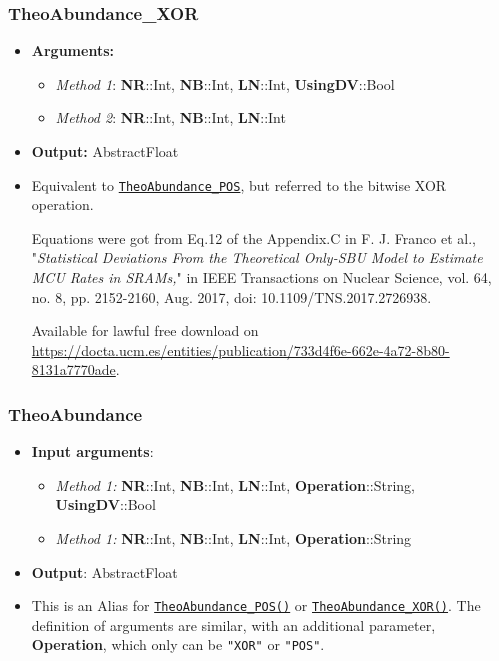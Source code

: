 \subsubsection*{TheoAbundance\_XOR}\label{Subsec:TheoAbundance_XOR}
%
\begin{itemize}
	\item \textbf{Arguments:}
	\begin{itemize}
		\item \textit{Method 1}: \textbf{NR}::Int, \textbf{NB}::Int, \textbf{LN}::Int, \textbf{UsingDV}::Bool
		\item \textit{Method 2}: \textbf{NR}::Int, \textbf{NB}::Int, \textbf{LN}::Int
	\end{itemize}
	\item \textbf{Output:} AbstractFloat
	\item Equivalent to \hyperref[Subsec:TheoAbundance_POS]{\texttt{TheoAbundance\_POS}}, but referred to the bitwise XOR operation. 
	
	Equations were got from Eq.12 of the Appendix.C in 
	F. J. Franco et al., "\textit{Statistical Deviations From the Theoretical Only-SBU
		Model to Estimate MCU Rates in SRAMs,}" in IEEE Transactions on Nuclear
	Science, vol. 64, no. 8, pp. 2152-2160, Aug. 2017,
	doi: 10.1109/TNS.2017.2726938. 
	
	Available for lawful free download on  \href{https://docta.ucm.es/entities/publication/733d4f6e-662e-4a72-8b80-8131a7770ade}{https://docta.ucm.es/entities/publication/733d4f6e-662e-4a72-8b80-8131a7770ade}.
\end{itemize}
%
\subsubsection*{TheoAbundance}\label{Subsec:TheoAbundance}
%
\begin{itemize}
	\item \textbf{Input arguments}:
	\begin{itemize}
		\item \textit{Method 1:} \textbf{NR}::Int, \textbf{NB}::Int, \textbf{LN}::Int, \textbf{Operation}::String, \textbf{UsingDV}::Bool
		\item \textit{Method 1:} \textbf{NR}::Int, \textbf{NB}::Int, \textbf{LN}::Int, \textbf{Operation}::String
	\end{itemize}
	\item \textbf{Output}: AbstractFloat
	\item This is an Alias for \hyperref[Subsec:TheoAbundance_POS]{ \texttt{TheoAbundance\_POS()}} or \hyperref[Subsec:TheoAbundance_XOR]{ \texttt{TheoAbundance\_XOR()}}. The definition of arguments are similar, with an additional parameter, \textbf{Operation}, which only can be \texttt{"XOR"} or \texttt{"POS"}. 
	
\end{itemize}

